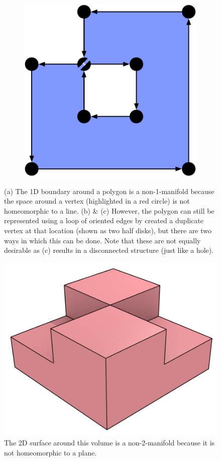 \begin{figure}
\begin{subfigure}[b]{0.3\linewidth}
\caption{}%
\label{subfig:nonmanifold-1}
\end{subfigure}
\quad
\begin{subfigure}[b]{0.3\linewidth}
\includegraphics[width=\linewidth]{figs/nonmanifold-2}
\caption{}%
\label{subfig:nonmanifold-2}
\end{subfigure}
\caption{(a) The 1D boundary around a polygon is a non-1-manifold because the space around a vertex (highlighted in a red circle) is not homeomorphic to a line. (b) \& (c) However, the polygon can still be represented using a loop of oriented edges by created a duplicate vertex at that location (shown as two half disks), but there are two ways in which this can be done.
Note that these are not equally desirable as (c) results in a disconnected structure (just like a hole).}%
\label{fig:nonmanifold}
\end{figure}

\begin{figure}
\centering
\includegraphics[width=0.4\linewidth]{figs/non2manifold.jpg}
\caption{The 2D surface around this volume is a non-2-manifold because it is not homeomorphic to a plane.}%
\label{fig:non2manifold}
\end{figure}

